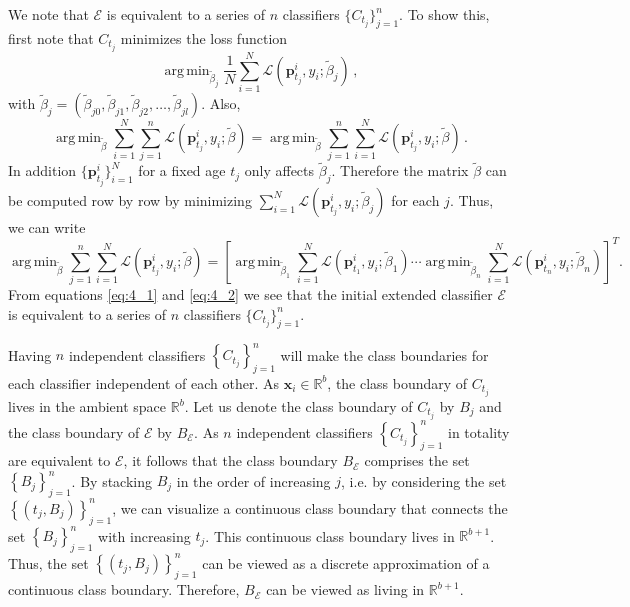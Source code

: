 \documentclass[a4paper,11pt]{article}
\DeclareMathOperator*{\argmin}{arg\,min}
\begin{document}
We note that $\mathscr{E}$ is equivalent to a series of $n$ classifiers $\{C_{t_j}\}_{j=1}^n $. To show this, first note that $C_{t_j}$ minimizes the loss function
$$
  \argmin_{\tilde{\beta}_j} \frac{1}{N} \sum_{i=1}^N \mathscr{L} ( \bm{p}^i_{t_j},y_i;\tilde{\beta}_j ) \, ,
$$
with $\tilde{\beta}_j = ( \tilde{\beta}_{j0}, \tilde{\beta}_{j1}, \tilde{\beta}_{j2}, \dots, \tilde{\beta}_{jl})$. Also,
\begin{equation}\label{eq:4_1}
	\argmin_{\tilde{\beta}} \sum_{i=1}^N \sum_{j=1}^n \mathscr{L} ( \bm{p}^i_{t_j},y_i;\tilde{\beta}) = \argmin_{\tilde{\beta}} \sum_{j=1}^n \sum_{i=1}^N \mathscr{L} ( \bm{p}^i_{t_j},y_i;\tilde{\beta} ) \, .
\end{equation}
In addition $\{\bm{p}^i_{t_j}\}_{i=1}^N$ for a fixed age $t_j$ only affects $\tilde{\beta}_j$. Therefore the matrix $\tilde{\beta}$ can be computed row by row by minimizing $\sum_{i=1}^N \mathscr{L} \left( \bm{p}^i_{t_j},y_i;\tilde{\beta}_j \right)$ for each $j$. Thus, we can write
\begin{equation}\label{eq:4_2}
	\argmin_{\tilde{\beta}} \sum_{j=1}^n \sum_{i=1}^N \mathscr{L} \left( \bm{p}^i_{t_j},y_i;\tilde{\beta} \right) = \left[\argmin_{\tilde{\beta}_1} \sum_{i=1}^N \mathscr{L} \left( \bm{p}^i_{t_1},y_i;\tilde{\beta}_1 \right) \cdots \argmin_{\tilde{\beta}_n} \sum_{i=1}^N \mathscr{L} \left( \bm{p}^i_{t_n},y_i;\tilde{\beta}_n \right) \right]^T \!\!.
\end{equation}
From equations \eqref{eq:4_1} and \eqref{eq:4_2} we see that the initial extended classifier $\mathscr{E}$ is equivalent to a series of $n$ classifiers $\{C_{t_j}\}_{j=1}^n $.

Having $n$ independent classifiers $\left\{C_{t_j}\right\}_{j=1}^n$ will make the class boundaries for each classifier independent of each other. As $\bm{x}_i \in \mathbb{R}^b$, the class boundary of $C_{t_j}$ lives in the ambient space $\mathbb{R}^{b}$. Let us denote the class boundary of $C_{t_j}$ by $B_j$ and the class boundary of $\mathscr{E}$ by $B_{\mathscr{E}}$. As $n$ independent classifiers $\left \{C_{t_j} \right \}_{j=1}^n$ in totality are equivalent to $\mathscr{E}$, it follows that the class boundary $B_{\mathscr{E}}$ comprises the set $\left\{ B_j \right\}_{j=1}^n $. By stacking $B_j$ in the order of increasing $j$, i.e. by considering the set $\left \{ \left(t_j, B_j \right) \right \}_{j=1}^n $, we can visualize a continuous class boundary that connects the set $\left\{ B_j \right\}_{j=1}^n$ with increasing $t_j$. This continuous class boundary lives in $\mathbb{R}^{b+1}$. Thus, the set $\left \{ \left(t_j, B_j \right) \right \}_{j=1}^n$ can be viewed as a discrete approximation of a continuous class boundary. Therefore, $B_{\mathscr{E}}$ can be viewed as living in $\mathbb{R}^{b+1}$.
\end{document}
